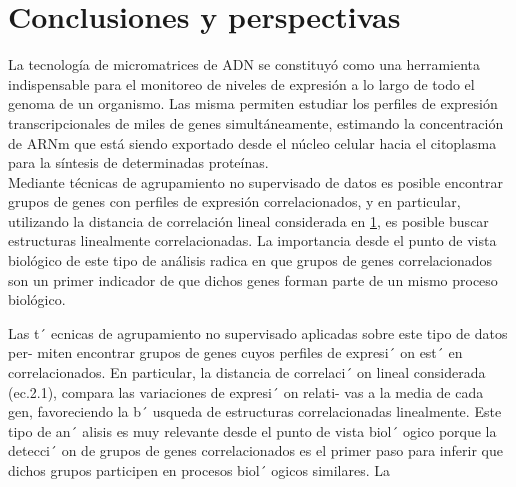 \chapter{Conclusiones y perspectivas}
La tecnología de micromatrices de ADN se constituyó como una herramienta indispensable para el monitoreo de niveles de expresión a lo largo de todo el genoma de un organismo. Las misma permiten estudiar los perfiles de expresión transcripcionales de miles de genes simultáneamente, estimando la concentración de ARNm que está siendo exportado desde el núcleo celular hacia el citoplasma para la síntesis de determinadas proteínas.\\
Mediante técnicas de agrupamiento no supervisado de datos es posible encontrar grupos de genes con perfiles de expresión correlacionados, y en particular, utilizando la distancia de correlación lineal considerada en \ref{}, es posible buscar estructuras linealmente correlacionadas. La importancia desde el punto de vista biológico de este tipo de análisis radica en que grupos de genes correlacionados   son un primer indicador de que dichos genes forman parte de un mismo proceso biológico.


Las t´
ecnicas de agrupamiento no supervisado aplicadas sobre este tipo de datos per-
miten encontrar grupos de genes cuyos perfiles de expresi´
on est´
en correlacionados. En particular,
la distancia de correlaci´
on lineal considerada (ec.2.1), compara las variaciones de expresi´
on relati-
vas a la media de cada gen, favoreciendo la b´
usqueda de estructuras correlacionadas linealmente.
Este tipo de an´
alisis es muy relevante desde el punto de vista biol´
ogico porque la detecci´
on de
grupos de genes correlacionados es el primer paso para inferir que dichos grupos participen en procesos biol´
ogicos similares.
La
